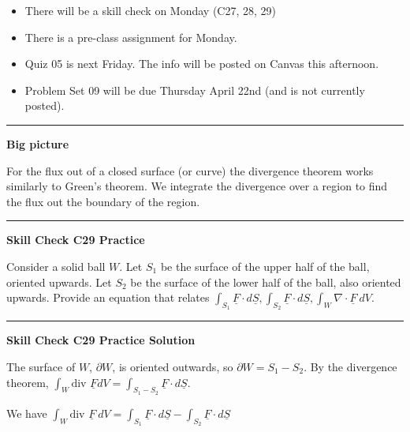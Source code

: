 \documentclass[12pt,letterpaper,noanswers]{exam}
\newcommand{\mb}[1]{\underline{#1}}
\begin{document}
 \pdfpageheight 11in 
  \pdfpagewidth 8.5in





\begin{itemize}
\itemsep0em
\item There will be a skill check on Monday (C27, 28, 29)
\item There is a pre-class assignment for Monday.
\item Quiz 05 is next Friday.  The info will be posted on Canvas this afternoon.
\item Problem Set 09 will be due Thursday April 22nd (and is not currently posted).
\end{itemize}

\hrule
\vspace{0.2cm}


\noindent\textbf{Big picture}

For the flux out of a closed surface (or curve) the divergence theorem works similarly to Green's theorem.  We integrate the divergence over a region to find the flux out the boundary of the region.
\vspace{0.2cm}
\hrule
\vspace{0.2cm}


\noindent\textbf{Skill Check C29 Practice}
\begin{questions}
\item Consider a solid ball $W$.  Let $S_1$ be the surface of the upper half of the ball, oriented upwards.  Let $S_2$ be the surface of the lower half of the ball, also oriented upwards.  Provide an equation that relates $\displaystyle\int_{S_1}\mb F\cdot d\mb S,\int_{S_2}\mb F\cdot d\mb S,\int_{W}\nabla \cdot \mb F\ dV$.

\end{questions}

\vspace{0.2cm}
\hrule
\vspace{0.2cm}
\noindent\textbf{Skill Check C29 Practice Solution}
\begin{questions}
\item The surface of $W$, $\partial W$, is oriented outwards, so $\partial W = S_1-S_2$.
By the divergence theorem, $\int_W \text{div }\mb F dV = \int_{S_1-S_2}\mb F\cdot d\mb S$.

We have $\displaystyle\int_W \text{div }\mb F\ dV = \int_{S_1}\mb F\cdot d\mb S-\int_{S_2}\mb F\cdot d\mb S$
\end{questions}
\end{document}
